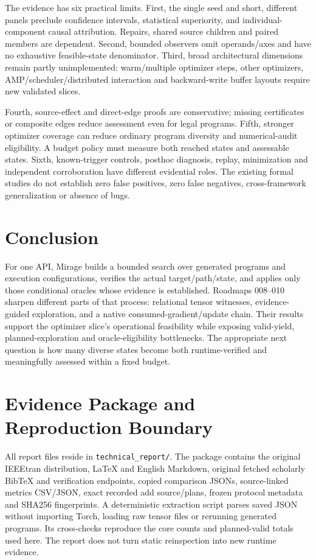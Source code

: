 \documentclass[conference]{IEEEtran}
\begin{document}
The evidence has six practical limits. First, the single seed and short, different panels preclude confidence intervals, statistical superiority, and individual-component causal attribution. Repairs, shared source children and paired members are dependent. Second, bounded observers omit operands/axes and have no exhaustive feasible-state denominator. Third, broad architectural dimensions remain partly unimplemented: warm/multiple optimizer steps, other optimizers, AMP/scheduler/distributed interaction and backward-write buffer layouts require new validated slices.

Fourth, source-effect and direct-edge proofs are conservative; missing certificates or composite edges reduce assessment even for legal programs. Fifth, stronger optimizer coverage can reduce ordinary program diversity and numerical-audit eligibility. A budget policy must measure both reached states and assessable states. Sixth, known-trigger controls, posthoc diagnosis, replay, minimization and independent corroboration have different evidential roles. The existing formal studies do not establish zero false positives, zero false negatives, cross-framework generalization or absence of bugs.

\section{Conclusion}
For one API, Mirage builds a bounded search over generated programs and execution configurations, verifies the actual target/path/state, and applies only those conditional oracles whose evidence is established. Roadmaps 008--010 sharpen different parts of that process: relational tensor witnesses, evidence-guided exploration, and a native consumed-gradient/update chain. Their results support the optimizer slice's operational feasibility while exposing valid-yield, planned-exploration and oracle-eligibility bottlenecks. The appropriate next question is how many diverse states become both runtime-verified and meaningfully assessed within a fixed budget.

\appendices
\section{Evidence Package and Reproduction Boundary}
All report files reside in \texttt{technical\_report/}. The package contains the original IEEEtran distribution, LaTeX and English Markdown, original fetched scholarly BibTeX and verification endpoints, copied comparison JSONs, source-linked metrics CSV/JSON, exact recorded add source/plans, frozen protocol metadata and SHA256 fingerprints. A deterministic extraction script parses saved JSON without importing Torch, loading raw tensor files or rerunning generated programs. Its cross-checks reproduce the core counts and planned-valid totals used here. The report does not turn static reinspection into new runtime evidence.
\end{document}
